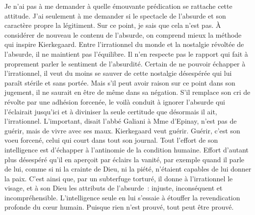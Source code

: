 \documentclass{book}
\begin{document}
Je n'ai pas à me demander à quelle émouvante prédication se rattache cette attitude. J'ai seulement à me demander si le spectacle de l'absurde et son caractère propre la légitiment. Sur ce point, je sais que cela n'est pas. À considérer de nouveau le contenu de l'absurde, on comprend mieux la méthode qui inspire Kierkegaard. Entre l'irrationnel du monde et la nostalgie révoltée de l'absurde, il ne maintient pas l'équilibre. Il n'en respecte pas le rapport qui fait à proprement parler le sentiment de l'absurdité. Certain de ne pouvoir échapper à l'irrationnel, il veut du moins se sauver de cette nostalgie désespérée qui lui paraît stérile et sans portée. Mais s'il peut avoir raison sur ce point dans son jugement, il ne saurait en être de même dans sa négation. S'il remplace son cri de révolte par une adhésion forcenée, le voilà conduit à ignorer l'absurde qui l'éclairait jusqu'ici et à diviniser la seule certitude que désormais il ait, l'irrationnel. L'important, disait l'abbé Galiani à Mme d'Epinay, n'est pas de guérir, mais de vivre avec ses maux. Kierkegaard veut guérir. Guérir, c'est son voeu forcené, celui qui court dans tout son journal. Tout l'effort de son intelligence est d'échapper à l'antinomie de la condition humaine. Effort d'autant plus désespéré qu'il en aperçoit par éclairs la vanité, par exemple quand il parle de lui, comme si ni la crainte de Dieu, ni la piété, n'étaient capables de lui donner la paix. C'est ainsi que, par un subterfuge torturé, il donne à l'irrationnel le visage, et à son Dieu les attributs de l'absurde : injuste, inconséquent et incompréhensible. L'intelligence seule en lui s'essaie à étouffer la revendication profonde du cœur humain. Puisque rien n'est prouvé, tout peut être prouvé.
\end{document}
